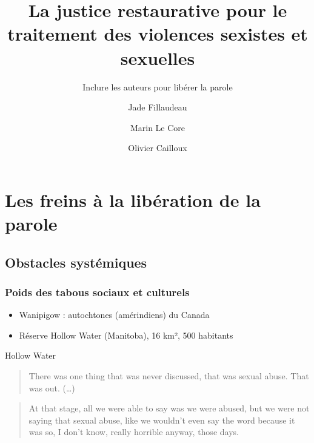 \documentclass[french]{beamer}
\title[La justice restaurative pour le traitement des VSS]{La justice restaurative pour le traitement des violences sexistes et sexuelles}
\subtitle{Inclure les auteurs pour libérer la parole}
\author[Jade \and Marin \and Olivier]{Jade Fillaudeau \and Marin Le Core \and Olivier Cailloux}
\institute[Paris-Dauphine]{Université Paris-Dauphine}
\date{\formatdate{31}{1}{2025}}
\begin{document}
\begin{frame}[plain]
  \titlepage
\end{frame}
\addtocounter{framenumber}{-1}

\begin{frame}
  \frametitle{}
  \tableofcontents[hideallsubsections]
\end{frame}


\section{Les freins à la libération de la parole}
\subsection{Obstacles systémiques}
\begin{frame}
  \frametitle{Poids des tabous sociaux et culturels}
  \begin{itemize}
    \item Wanipigow : autochtones (amérindiens) du Canada
    \item Réserve Hollow Water (Manitoba), 16 km², 500 habitants
  \end{itemize}
  \begin{block}{Hollow Water}
    \begin{quote}
      There was one thing that was never discussed, that was sexual abuse.
      That was out. 
      (…)
    \end{quote}
    \begin{quote}
      At that stage, all we were able to say was we were abused, but we were not saying that sexual abuse, like we wouldn't even say the word because it was so, I don't know, really horrible anyway, those days.
    \end{quote}
  \end{block}
\end{frame}
\end{document}
